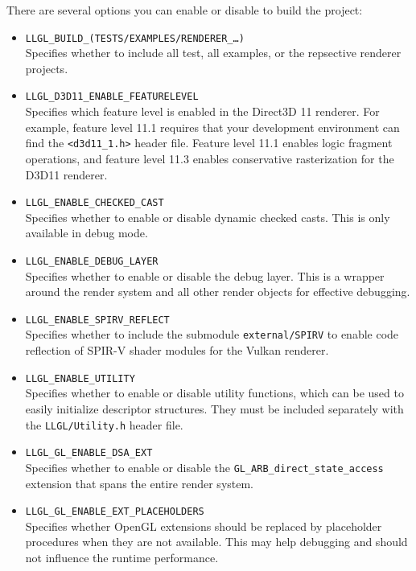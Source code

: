 \documentclass{article}
\begin{document}
There are several options you can enable or disable to build the project:
\begin{itemize}
	\item \texttt{LLGL\_BUILD\_(TESTS/EXAMPLES/RENDERER\_\dots)} \\
	Specifies whether to include all test, all examples, or the repsective renderer projects.
	
	\item \texttt{LLGL\_D3D11\_ENABLE\_FEATURELEVEL} \\
	Specifies which feature level is enabled in the Direct3D 11 renderer.
	For example, feature level 11.1 requires that your development environment can find the \texttt{<d3d11\_1.h>} header file.
	Feature level 11.1 enables logic fragment operations, and feature level 11.3 enables conservative rasterization for the D3D11 renderer.
	
	\item \texttt{LLGL\_ENABLE\_CHECKED\_CAST} \\
	Specifies whether to enable or disable dynamic checked casts.
	This is only available in debug mode.
	
	\item \texttt{LLGL\_ENABLE\_DEBUG\_LAYER} \\
	Specifies whether to enable or disable the debug layer.
	This is a wrapper around the render system and all other render objects for effective debugging.
	
	\item \texttt{LLGL\_ENABLE\_SPIRV\_REFLECT} \\
	Specifies whether to include the submodule \texttt{external/SPIRV} to enable code reflection of SPIR-V shader modules for the Vulkan renderer.
	
	\item \texttt{LLGL\_ENABLE\_UTILITY} \\
	Specifies whether to enable or disable utility functions, which can be used to easily initialize descriptor structures.
	They must be included separately with the \texttt{LLGL/Utility.h} header file.
	
	\item \texttt{LLGL\_GL\_ENABLE\_DSA\_EXT} \\
	Specifies whether to enable or disable the \texttt{GL\_ARB\_direct\_state\_access} extension that spans the entire render system.
	
	\item \texttt{LLGL\_GL\_ENABLE\_EXT\_PLACEHOLDERS} \\
	Specifies whether OpenGL extensions should be replaced by placeholder procedures
	when they are not available. This may help debugging and should not influence the runtime performance.
	

\end{itemize}
\end{document}
